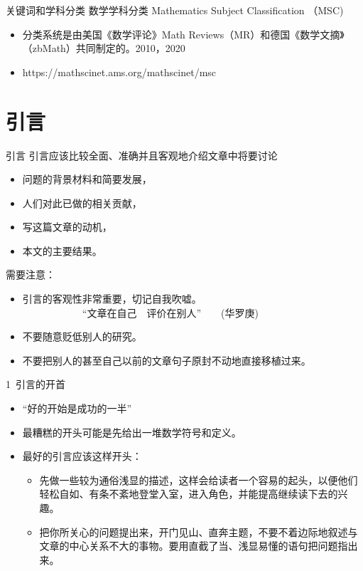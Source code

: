 \documentclass[13pt]{ctexbeamer}
\begin{document}
\begin{frame}{关键词和学科分类}
	数学学科分类 Mathematics Subject Classification  （MSC)
	\begin{itemize}

		\item 分类系统是由美国《数学评论》Math Reviews（MR）和德国《数学文摘》（zbMath）共同制定的。2010，2020

		\item https://mathscinet.ams.org/mathscinet/msc
	\end{itemize}
\end{frame}


\section{引言}
\begin{frame}{引言}
	引言应该比较全面、准确并且客观地介绍文章中将要讨论
	\begin{itemize}
		\item 问题的背景材料和简要发展，
		\item 人们对此已做的相关贡献，
		\item 写这篇文章的动机，
		\item 本文的主要结果。
	\end{itemize}
需要注意：
	\begin{itemize}
	\item 引言的客观性非常重要，切记自我吹嘘。\\
	~~~~~~~~~~~~``文章在自己~~评价在别人''~~~~(华罗庚)
	\item 不要随意贬低别人的研究。
	\item 不要把别人的甚至自己以前的文章句子原封不动地直接移植过来。
\end{itemize}
\end{frame}

\begin{frame}{1~引言的开首}
		\begin{itemize}
		\item ``好的开始是成功的一半''

		\item 最糟糕的开头可能是先给出一堆数学符号和定义。

		\item  最好的引言应该这样开头：
	\begin{itemize}
		\item 先做一些较为通俗浅显的描述，这样会给读者一个容易的起头，以便他们轻松自如、有条不紊地登堂入室，进入角色，并能提高继续读下去的兴趣。
		\item  把你所关心的问题提出来，开门见山、直奔主题，不要不着边际地叙述与文章的中心关系不大的事物。要用直截了当、浅显易懂的语句把问题指出来。
	\end{itemize}
	\end{itemize}
\end{frame}
\end{document}
